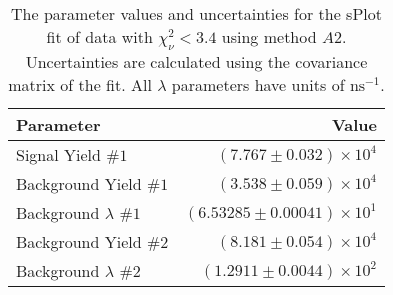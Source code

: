 
\begin{table}
    \begin{center}
        \begin{tabular}{lr}\toprule
            Parameter & Value \\\midrule
Signal Yield $\#1$ & $(7.767 \pm 0.032) \times 10^{4}$ \\
Background Yield $\#1$ & $(3.538 \pm 0.059) \times 10^{4}$ \\
Background $\lambda$ $\#1$ & $(6.53285 \pm 0.00041) \times 10^{1}$ \\
Background Yield $\#2$ & $(8.181 \pm 0.054) \times 10^{4}$ \\
Background $\lambda$ $\#2$ & $(1.2911 \pm 0.0044) \times 10^{2}$ \\\bottomrule
        \end{tabular}
        \caption{The parameter values and uncertainties for the sPlot fit of data with $\chi^2_\nu < 3.4$ using method $A2$. Uncertainties are calculated using the covariance matrix of the fit. All $\lambda$ parameters have units of $\si{\nano\second}^{-1}$.}\label{tab:splot-fit-chisqdof-3.4-splot-D-1s-2b}
    \end{center}
\end{table}


